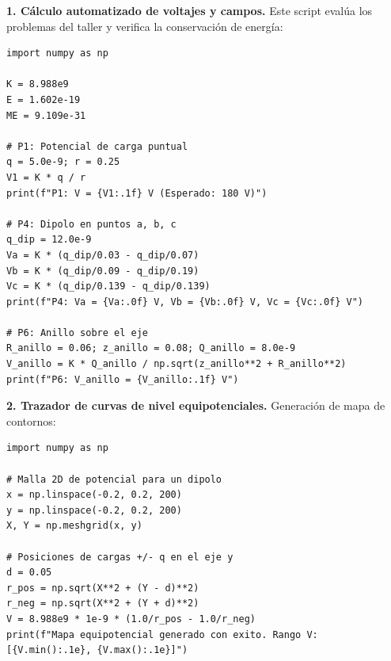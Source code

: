 \documentclass[11pt]{article}
\begin{document}

\textbf{1. Cálculo automatizado de voltajes y campos.} Este script evalúa los problemas del taller y verifica la conservación de energía:
\begin{lstlisting}[style=e10python]
import numpy as np

K = 8.988e9
E = 1.602e-19
ME = 9.109e-31

# P1: Potencial de carga puntual
q = 5.0e-9; r = 0.25
V1 = K * q / r
print(f"P1: V = {V1:.1f} V (Esperado: 180 V)")

# P4: Dipolo en puntos a, b, c
q_dip = 12.0e-9
Va = K * (q_dip/0.03 - q_dip/0.07)
Vb = K * (q_dip/0.09 - q_dip/0.19)
Vc = K * (q_dip/0.139 - q_dip/0.139)
print(f"P4: Va = {Va:.0f} V, Vb = {Vb:.0f} V, Vc = {Vc:.0f} V")

# P6: Anillo sobre el eje
R_anillo = 0.06; z_anillo = 0.08; Q_anillo = 8.0e-9
V_anillo = K * Q_anillo / np.sqrt(z_anillo**2 + R_anillo**2)
print(f"P6: V_anillo = {V_anillo:.1f} V")
\end{lstlisting}

\textbf{2. Trazador de curvas de nivel equipotenciales.} Generación de mapa de contornos:
\begin{lstlisting}[style=e10python]
import numpy as np

# Malla 2D de potencial para un dipolo
x = np.linspace(-0.2, 0.2, 200)
y = np.linspace(-0.2, 0.2, 200)
X, Y = np.meshgrid(x, y)

# Posiciones de cargas +/- q en el eje y
d = 0.05
r_pos = np.sqrt(X**2 + (Y - d)**2)
r_neg = np.sqrt(X**2 + (Y + d)**2)
V = 8.988e9 * 1e-9 * (1.0/r_pos - 1.0/r_neg)
print(f"Mapa equipotencial generado con exito. Rango V: [{V.min():.1e}, {V.max():.1e}]")
\end{lstlisting}


\medskip
{}

\medskip
{}
\end{document}
